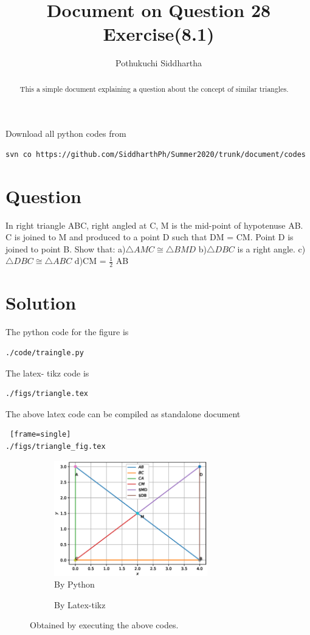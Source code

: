 \documentclass[journal,12pt,onecolumn]{IEEEtran}
\title{Document on Question 28 Exercise(8.1)}
\author{Pothukuchi Siddhartha}
\begin{document}
\maketitle
\begin{abstract}
This a simple document explaining a question about the concept of similar triangles.
\end{abstract}
Download all python codes from 
%
\begin{lstlisting}[frame= single]
svn co https://github.com/SiddharthPh/Summer2020/trunk/document/codes
\end{lstlisting}
%
\section*{Question}
In right triangle ABC, right angled at C, M is
the mid-point of hypotenuse AB. C is joined to
M and produced to a point D such that DM =
CM. Point D is joined to point B. Show that:
\newline
a)$\triangle  AMC  \cong   \triangle  BMD $
\newline
b)$\triangle DBC $ is a right angle.
\newline
c)$\triangle  DBC  \cong  \triangle  ABC $
\newline
d)CM = $\frac{1}{2}$ AB

\section*{\textbf{Solution}}
The python code for the figure is
\begin{lstlisting}[frame=single]
./code/traingle.py
\end{lstlisting}
The latex- tikz code is
\begin{lstlisting}[frame=single]
./figs/triangle.tex
\end{lstlisting}
The above latex code can be compiled as standalone document
\begin{lstlisting} [frame=single]
./figs/triangle_fig.tex
\end{lstlisting}
\begin{figure}[h]
\begin{subfigure}{0.5\textwidth}
\includegraphics[width=0.9\linewidth, height=5cm]{./figs/triangle.eps}
\caption{By Python}
\end{subfigure}
%
\begin{subfigure}{0.4\textwidth}
\begin{flushright}

\caption{By Latex-tikz}
\end{flushright}
\end{subfigure}
\caption{Obtained by executing the  above codes.}
\end{figure}
%
\end{document}
